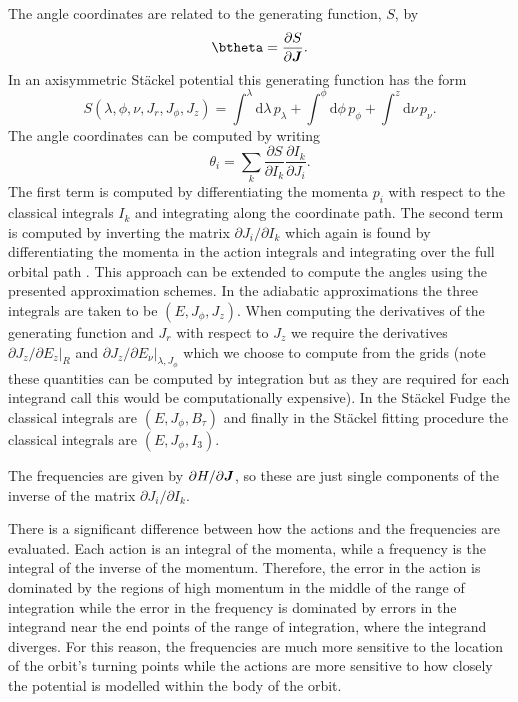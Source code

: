 \documentclass[useAMS,usenatbib,fleqn,a4paper]{mn2e}
\newcommand{\bs}[1]{\bmath{#1}}
\begin{document}
The angle
coordinates are related to the generating function, $S$, by
\begin{equation}
\btheta = \frac{\partial S}{\partial \bs{J}}.
\end{equation}
In an axisymmetric  St\"ackel  potential this generating function has the form
\begin{equation}
S(\lambda,\phi,\nu,J_r,J_\phi,J_z) = \int^\lambda\mathrm{d}\lambda\,p_\lambda
+\int^\phi\mathrm{d}\phi\,p_\phi+\int^z\mathrm{d}\nu\,p_\nu.
\end{equation}
 The angle coordinates can be computed by writing
\begin{equation}
\theta_i = \sum_k\frac{\partial S}{\partial I_k}\frac{\partial I_k}{\partial J_i}.
\end{equation}
 The first term is computed by differentiating the
momenta $p_i$ with respect to the classical integrals $I_k$ and
integrating along the coordinate path. The second term is computed by
inverting the matrix $\partial J_i/\partial I_k$ which again is found
by differentiating the momenta in the action integrals and integrating over
the full orbital path  \citep[see for example the appendix of][]{Sanders2012a}.
This approach can be extended to compute the angles using the presented
approximation schemes. In the adiabatic approximations the three integrals
are taken to be $(E,J_\phi,J_z)$. When computing the derivatives of the
generating function and $J_r$ with respect to $J_z$ we require the
derivatives $\partial J_z/\partial E_z|_R$ and $\partial J_z/\partial
E_\nu|_{\lambda,J_\phi}$ which we choose to compute from the grids (note these quantities can be computed by integration but as they are required for each integrand call this would be computationally expensive). In the
St\"ackel Fudge the classical integrals are $(E,J_\phi,B_\tau)$ and finally
in the St\"ackel fitting procedure the classical integrals are $(E,J_\phi,I_3)$.

The frequencies are given by
$\partial H/\partial \bs{J}$, so these are just single components of the
inverse of the matrix $\partial J_i/\partial I_k$.

There is a significant difference between how the actions and the frequencies
are evaluated. Each action is an integral of the momenta, while a frequency
is the integral of the inverse of the momentum. Therefore, the error in the
action is dominated by the regions of high momentum in the middle of the
range of integration while the error in the frequency is dominated by errors
in the integrand near the end points of the range of integration, where the
integrand diverges. For this reason, the frequencies are much more sensitive
to the location of the orbit's turning points while the actions are more
sensitive to how closely the potential is modelled within the body of the orbit.
\end{document}
